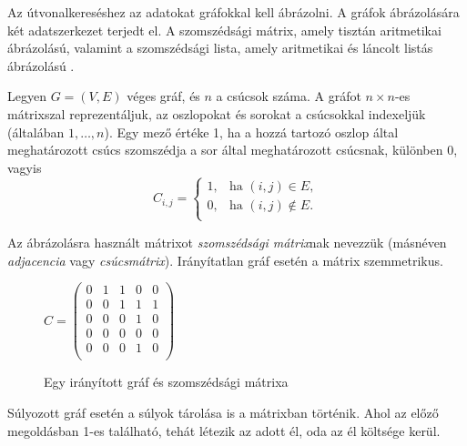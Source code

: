 

Az útvonalkereséshez az adatokat gráfokkal kell ábrázolni. A gráfok ábrázolására két adatszerkezet terjedt el. A szomszédsági mátrix, amely tisztán aritmetikai ábrázolású, valamint a szomszédsági lista, amely aritmetikai és láncolt listás ábrázolású \cite{grafabrazolas}.


Legyen $G = (V,E)$ véges gráf, és $n$ a csúcsok száma. A gráfot $n \times n$-es mátrixszal reprezentáljuk, az oszlopokat és sorokat a csúcsokkal indexeljük (általában $1, \ldots, n$). Egy mező értéke 1, ha a hozzá tartozó oszlop által meghatározott csúcs szomszédja a sor által meghatározott csúcsnak, különben 0, vagyis
$$
C_{i, j} = \begin{cases}
    1, & \text{ha } (i, j) \in E, \\
    0, & \text{ha } (i, j) \notin E. \\
\end{cases}
$$

Az ábrázolásra használt mátrixot \textit{szomszédsági mátrix}nak nevezzük (másnéven \textit{adjacencia} vagy \textit{csúcsmátrix}). Irányítatlan gráf esetén a mátrix szemmetrikus.

\begin{figure}
\centering
\begin{minipage}{.5\textwidth}
    \centering
    
\end{minipage}\begin{minipage}{.5\textwidth}
    \centering
$
C =
\left(
\begin{array}{ccccc}
0 & 1 & 1 & 0 & 0 \\
0 & 0 & 1 & 1 & 1 \\
0 & 0 & 0 & 1 & 0 \\
0 & 0 & 0 & 0 & 0 \\
0 & 0 & 0 & 1 & 0 \\
\end{array}
\right)
$
\end{minipage}
\caption{Egy irányított gráf és szomszédsági mátrixa}
\label{fig:szomszedsagi_graf_matrix}
\end{figure}

Súlyozott gráf esetén a súlyok tárolása is a mátrixban történik. Ahol az előző megoldásban 1-es található, tehát létezik az adott él, oda az él költsége kerül.

